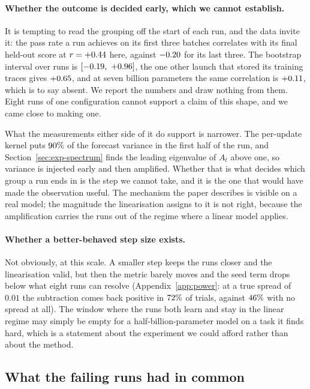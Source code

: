 \paragraph{Whether the outcome is decided early, which we cannot establish.} It is tempting to read
the grouping off the start of each run, and the data invite it: the pass rate a run achieves on its
first three batches correlates with its final held-out score at $r = +0.44$ here,
against $-0.20$ for its last three. The bootstrap interval over runs is
$[-0.19,\ +0.96]$, the one other launch that stored its
training traces gives $+0.65$, and at seven billion parameters the same correlation is
$+0.11$, which is to say absent. We report the numbers and draw nothing from
them. Eight runs of one configuration cannot support a claim of this shape, and we came close to
making one.

What the measurements either side of it do support is narrower. The per-update kernel puts
$90\%$ of the forecast variance in the first half of the run, and
Section~\ref{sec:exp-spectrum} finds the leading eigenvalue of $A_t$ above one, so variance is
injected early and then amplified. Whether that is what decides which group a run ends in is the
step we cannot take, and it is the one that would have made the observation useful. The mechanism
the paper describes is visible on a real model; the magnitude the linearisation assigns to it is
not right, because the amplification carries the runs out of the regime where a linear model
applies.

\paragraph{Whether a better-behaved step size exists.} Not obviously, at this scale. A smaller step
keeps the runs closer and the linearisation valid, but then the metric barely moves and the seed
term drops below what eight runs can resolve (Appendix~\ref{app:power}: at a true spread of $0.01$
the subtraction comes back positive in $72\%$ of trials, against
$46\%$ with no spread at all). The window where the runs both learn and stay in the
linear regime may simply be empty for a half-billion-parameter model on a task it finds hard, which
is a statement about the experiment we could afford rather than about the method.

\subsection{What the failing runs had in common}
\label{sec:exp-support}

